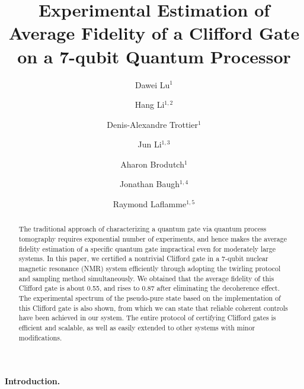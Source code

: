 \documentclass[prl,twocolumn,showpacs]{revtex4-1}
\begin{document}
\title{Experimental Estimation of Average Fidelity of a Clifford Gate on a 7-qubit Quantum Processor}
\author{Dawei Lu$^{1}$}
\author{Hang Li$^{1,2}$}
\author{Denis-Alexandre Trottier$^{1}$}
\author{Jun Li$^{1,3}$}
\author{Aharon Brodutch$^{1}$}
\author{Jonathan Baugh$^{1,4}$}
\author{Raymond Laflamme$^{1,5}$}




\begin{abstract}
The traditional approach of characterizing a quantum gate via quantum process tomography requires exponential number of experiments, and hence makes the average fidelity estimation of a specific quantum gate impractical even for moderately large systems. In this paper, we certified a nontrivial Clifford gate in a 7-qubit nuclear magnetic resonance (NMR) system efficiently through adopting the twirling protocol and sampling method simultaneously. We obtained that the average fidelity of this Clifford gate is about 0.55, and rises to 0.87 after eliminating the decoherence effect. The experimental spectrum of the pseudo-pure state based on the implementation of this Clifford gate is also shown, from which we can state that reliable coherent controls have been achieved in our system. The entire protocol of certifying Clifford gates is efficient and scalable, as well as easily extended to other systems with minor modifications.
\end{abstract}

\maketitle



\paragraph*{Introduction.}
\end{document}
